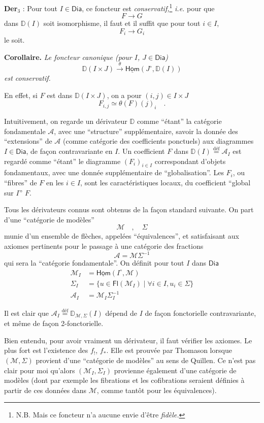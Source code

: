 \documentclass[11pt]{article}
\newcommand{\printedpage}[1]{\marginpar{\footnotesize p.~#1}}
\newcommand{\msp}[1]{\marginpar{\footnotesize [#1]}}
\newcommand{\uHom}{\underline{\mathsf{Hom}}}
\newcommand{\Dia}{\mathsf{Dia}}
\newcommand{\DD}{\mathbb{D}}
\newcommand{\defeq}{\overset{\text{déf}}{=}}
\begin{document}
\noindent\textbf{Der}$_3$ : Pour tout $I \in \Dia$, ce foncteur est \textit{conservatif,}\footnote[4]{N.B. Mais ce foncteur n’a aucune envie d’être \textit{fidèle.}} \textit{i.e.} pour que
\[
F \longrightarrow G
\]
\printedpage{10}%
dans $\DD(I)$ soit isomorphisme, il faut et il suffit que pour tout $i \in I$,
\[
F_i \longrightarrow G_i
\]
le soit.

\noindent\textbf{Corollaire.} \textit{Le foncteur canonique (pour $I$, $J \in \Dia$)}
\[
\DD(I \times J) \xrightarrow{\ \theta\ } \uHom(J^\circ, \DD(I))
\]
\textit{est conservatif.}

En effet, si $F$ est dans $\DD(I \times J)$, on a pour $(i,j) \in I \times J$
\[
F_{i,j} \simeq \theta(F)(j)_i \quad .
\]

\noindent\msp{page 12}Intuitivement, on regarde un dérivateur $\DD$ comme “étant” la catégorie fondamentale $\mathcal{A}$, avec une “structure” supplémentaire, savoir la donnée des “extensions” de $\mathcal{A}$ (comme catégorie des coefficients ponctuels) aux diagrammes $I \in \Dia$, de façon contravariante en $I$. Un coefficient $F$ dans $\DD(I) \defeq \mathcal{A}_I$ est regardé comme “étant” le diagramme $(F_i)_{i\in I}$ correspondant d’objets fondamentaux, avec une donnée supplémentaire de “globalisation”. Les $F_i$, ou “fibres” de $F$ en les $i \in I$, sont les caractéristiques locaux, du coefficient “global sur $I$” $F$. %

Tous les dérivateurs connus sont obtenus de la façon standard suivante. On part d’une “catégorie de modèles”
\[
\mathcal{M} \quad , \quad \Sigma
\]
munie d’un ensemble de flèches, appelées “équivalences”, et satisfaisant aux axiomes pertinents pour le passage à une catégorie des fractions
\[
\mathcal{A} = \mathcal{M}\Sigma^{-1}
\]
qui sera la “catégorie fondamentale”. On définit pour tout $I$ dans $\Dia$
\[
\begin{aligned}
\mathcal{M}_I &= \uHom(I^\circ,\mathcal{M}) \\
\Sigma_I &= \{u \in \mathsf{Fl}(\mathcal{M}_I) \mid \forall i \in I, u_i \in \Sigma\} \\
\mathcal{A}_I &= \mathcal{M}_I\Sigma_I^{-1}
\end{aligned}
\]

\noindent\msp{page 13}Il est clair que $\mathcal{A}_I \defeq \DD_{\mathcal{M},\Sigma}(I)$ dépend de $I$ de façon fonctorielle contravariante, et même de façon 2-fonctorielle.

Bien entendu, pour avoir vraiment un dérivateur, il faut vérifier les axiomes. Le plus fort est l’existence des $f_!$, $f_*$. Elle est prouvée par Thomason lorsque $(\mathcal{M},\Sigma)$ provient d’une “catégorie de modèles” au sens de Quillen. Ce n’est pas clair pour moi qu’alors $(\mathcal{M}_I,\Sigma_I)$ provienne également d’une catégorie de modèles (dont par exemple les fibrations \printedpage{11}%
et les cofibrations seraient définies à partir de ces données dans $\mathcal{M}$, comme tantôt pour les équivalences).
\end{document}
